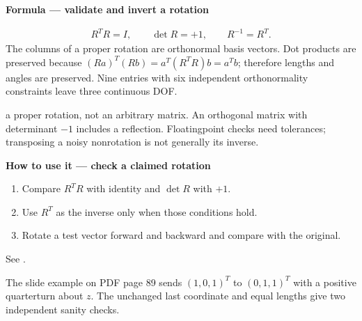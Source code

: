 \documentclass[letterpaper,11pt,english,openany,oneside]{jupyterBook}
\begin{document}
\begin{TextbookBox}
\textbf{Formula — validate and invert a rotation}\par\smallskip
\begin{equation}\label{equation:lectures/lecture01/rotations:eq-lec01-orthogonal}
\begin{split}R^TR=I,\qquad \det R=+1,\qquad R^{-1}=R^T.\end{split}
\end{equation}
\sphinxAtStartPar
The columns of a proper rotation are orthonormal basis vectors. Dot products are preserved because \((Ra)^T(Rb)=a^T(R^TR)b=a^Tb\); therefore lengths and angles are preserved. Nine entries with six independent orthonormality constraints leave three continuous DOF.

\sphinxAtStartPar
{} a proper rotation, not an arbitrary matrix. An orthogonal matrix with determinant \(-1\) includes a reflection. Floating\sphinxhyphen{}point checks need tolerances; transposing a noisy nonrotation is not generally its inverse.

\end{TextbookBox}

\begin{TextbookBox}
\textbf{How to use it — check a claimed rotation}\par\smallskip
\begin{enumerate}
%
\item {}
\sphinxAtStartPar
Compare \(R^TR\) with identity and \(\det R\) with \(+1\).

\item {}
\sphinxAtStartPar
Use \(R^T\) as the inverse only when those conditions hold.

\item {}
\sphinxAtStartPar
Rotate a test vector forward and backward and compare with the original.

\end{enumerate}

\sphinxAtStartPar
See {\hyperref[\detokenize{lectures/lecture01/rotations:ex-lec01-order}]{}}.

\end{TextbookBox}

\sphinxAtStartPar
The slide example on PDF page 89 sends \((1,0,1)^T\) to \((0,1,1)^T\) with a positive quarter\sphinxhyphen{}turn about \(z\). The unchanged last coordinate and equal lengths give two independent sanity checks.
\end{document}
